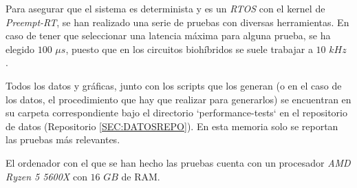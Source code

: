 
Para asegurar que el sistema es determinista y es un \textit{RTOS} con el kernel de \textit{Preempt-RT}, se han realizado una serie de pruebas con diversas herramientas. En caso de tener que seleccionar una latencia máxima para alguna prueba, se ha elegido $100$ $\mu s$, puesto que en los circuitos biohíbridos se suele trabajar a $10$ $kHz$ \cite{Amaducci2019}.

Todos los datos y gráficas, junto con los scripts que los generan (o en el caso de los datos, el procedimiento que hay que realizar para generarlos) se encuentran en su carpeta correspondiente bajo el directorio `performance-tests` en el repositorio de datos (Repositorio \ref{SEC:DATOSREPO}). En esta memoria solo se reportan las pruebas más relevantes.

El ordenador con el que se han hecho las pruebas cuenta con un procesador \textit{AMD Ryzen 5 5600X} con $16$ $GB$ de RAM.